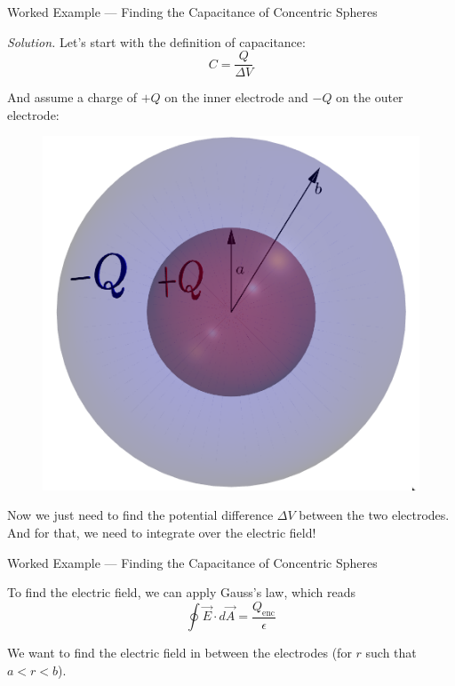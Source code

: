 \documentclass{beamer}
\begin{document}
\begin{frame}{Worked Example --- Finding the Capacitance of Concentric Spheres}

\textit{Solution.} Let's start with the definition of capacitance:
\begin{equation*}
    C = \frac{Q}{\Delta V}
\end{equation*}

And assume a charge of $+Q$ on the inner electrode and $-Q$ on the outer electrode:

\begin{figure}
\centering
\includegraphics[height=0.36\textheight]{figures/twol.png}
\end{figure}

Now we just need to find the potential difference $\Delta V$ between the two electrodes. And for that, we need to integrate over the electric field!

\end{frame}

\begin{frame}{Worked Example --- Finding the Capacitance of Concentric Spheres}

To find the electric field, we can apply Gauss's law, which reads
\begin{equation*}
    \oint \vec{E} \cdot d\vec{A} = \frac{Q_{\text{enc}}}{\epsilon}
\end{equation*}

We want to find the electric field in between the electrodes (for $r$ such that $a < r < b$).

\end{frame}
\end{document}
